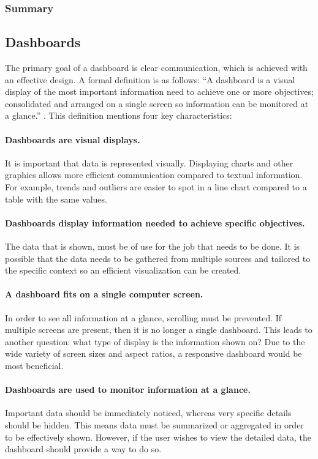         \subsubsection{Summary}

    \subsection{Dashboards} \label{2_dashboards}

    The primary goal of a dashboard is clear communication, which is achieved with an effective design. A formal definition is as follows: ``A dashboard is a visual display of the most important information need to achieve one or more objectives; consolidated and arranged on a single screen so information can be monitored at a glance.'' \cite{dashboard}. This definition mentions four key characteristics:

    \paragraph{Dashboards are visual displays.} It is important that data is represented visually. Displaying charts and other graphics allows more efficient communication compared to textual information. For example, trends and outliers are easier to spot in a line chart compared to a table with the same values.

    \paragraph{Dashboards display information needed to achieve specific objectives.} The data that is shown, must be of use for the job that needs to be done. It is possible that the data needs to be gathered from multiple sources and tailored to the specific context so an efficient visualization can be created.

    \paragraph{A dashboard fits on a single computer screen.} In order to see all information at a glance, scrolling must be prevented. If multiple screens are present, then it is no longer a single dashboard. This leads to another question: what type of display is the information shown on? Due to the wide variety of screen sizes and aspect ratios, a responsive dashboard would be most beneficial.

    \paragraph{Dashboards are used to monitor information at a glance.} Important data should be immediately noticed, whereas very specific details should be hidden. This means data must be summarized or aggregated in order to be effectively shown. However, if the user wishes to view the detailed data, the dashboard should provide a way to do so.\\

